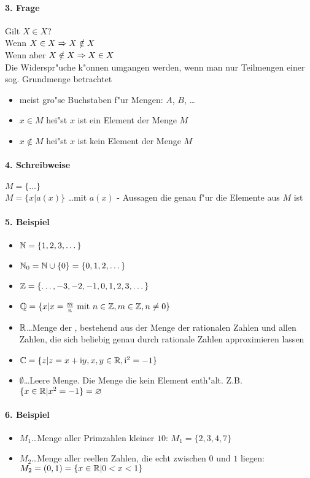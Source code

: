 \paragraph{3. Frage} Gilt $X\in X$?\\
Wenn $X\in X\Rightarrow X\notin X$ \Lightning\\
Wenn aber $X\notin X\Rightarrow X\in X$ \Lightning\\
Die Widerspr"uche k"onnen umgangen werden, wenn man nur Teilmengen einer sog. Grundmenge betrachtet
\begin{itemize}
	\item meist gro"se Buchstaben f"ur Mengen: $A$, $B$, \dots
	\item $x\in M$ hei"st $x$ ist ein Element der Menge $M$
	\item $x\notin M$ hei"st $x$ ist kein Element der Menge $M$
\end{itemize}

\paragraph{4. Schreibweise} \parskp
$M=\{\dots\}$\\
$M=\{x|a(x)\}$ \dots mit $a(x)$ - Aussagen die genau f"ur die Elemente aus $M$ \true ist

\paragraph{5. Beispiel}
\begin{itemize}
	\item $\mathbb{N}=\{1,2,3,\dots\}$ 
	\item $\mathbb{N}_0=\mathbb{N}\cup\{0\}=\{0,1,2,\dots\}$ 
	\item $\mathbb{Z}=\{\dots,-3,-2,-1,0,1,2,3,\dots\}$ 
	\item $\mathbb{Q}=\{x|x=\frac{m}{n}\text{ mit }n\in\mathbb{Z},m\in\mathbb{Z},n\neq0\}$ 
	\item $\mathbb{R}$\dots Menge der , bestehend aus der Menge der rationalen Zahlen und allen Zahlen, die sich beliebig genau durch rationale Zahlen approximieren lassen
	\item $\mathbb{C}=\{z|z=x+\mathrm iy, x,y\in\mathbb{R},\mathrm i^2=-1\}$
	\item $\emptyset$\dots Leere Menge. Die Menge die kein Element enth"alt. Z.B. $\{x\in\mathbb{R}|x^2=-1\}=\varnothing$
\end{itemize}

\paragraph{6. Beispiel}
\begin{itemize}
	\item $M_1$\dots Menge aller Primzahlen kleiner $10$: $M_1=\{2,3,4,7\}$
	\item $M_2$\dots Menge aller reellen Zahlen, die echt zwischen $0$ und $1$ liegen:\\ $M_2=(0,1)=\{x\in\mathbb{R}|0<x<1\}$
\end{itemize}

